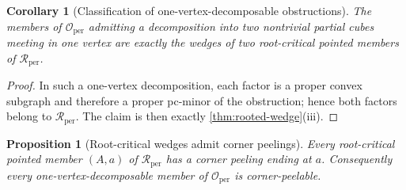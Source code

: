 \documentclass[11pt]{article}
\newtheorem{proposition}[theorem]{Proposition}
\newtheorem{corollary}[theorem]{Corollary}
\theoremstyle{definition}
\theoremstyle{remark}
\newcommand{\Rper}{\mathcal R_{\mathrm{per}}}
\newcommand{\Oper}{\mathcal O_{\mathrm{per}}}
\begin{document}
\begin{corollary}[Classification of one-vertex-decomposable obstructions]
\label{cor:wedge-classification}
The members of \(\Oper\) admitting a decomposition into two nontrivial
partial cubes meeting in one vertex are exactly the wedges of two
root-critical pointed members of \(\Rper\).
\end{corollary}

\begin{proof}
In such a one-vertex decomposition, each factor is a proper convex subgraph
and therefore a proper pc-minor of the obstruction; hence both factors
belong to \(\Rper\).  The claim is then exactly
\cref{thm:rooted-wedge}(iii).
\end{proof}

\begin{proposition}[Root-critical wedges admit corner peelings]
\label{prop:root-critical-wedges-peel}
Every root-critical pointed member \((A,a)\) of \(\Rper\) has a corner
peeling ending at \(a\).  Consequently every one-vertex-decomposable member
of \(\Oper\) is corner-peelable.
\end{proposition}
\end{document}
